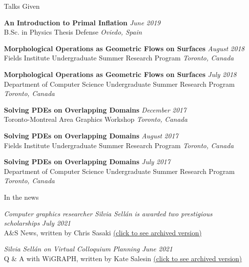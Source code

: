 \documentclass{resume}
\newcommand{\talk}[4]{
    {\bf #1} \hfill {\em \small #2} \\ %
    {\small #3} \hfill {\em \small #4}
}
\begin{document}
\begin{rSection}{Talks Given}
\talk{An Introduction to Primal Inflation}{June 2019}
{B.Sc. in Physics Thesis Defense}{Oviedo, Spain}

\talk{Morphological Operations as Geometric Flows on Surfaces}{August 2018}
{Fields Institute Undergraduate Summer Research Program}{Toronto, Canada}

\talk{Morphological Operations as Geometric Flows on Surfaces}{July 2018}
{Department of Computer Science Undergraduate Summer Research Program}{Toronto, Canada}

\talk{Solving PDEs on Overlapping Domains}{December 2017}
{Toronto-Montreal Area Graphics Workshop}{Toronto, Canada}

\talk{Solving PDEs on Overlapping Domains}{August 2017}
{Fields Institute Undergraduate Summer Research Program}{Toronto, Canada}

\talk{Solving PDEs on Overlapping Domains}{July 2017}
{Department of Computer Science Undergraduate Summer Research Program}{Toronto, Canada}

\end{rSection}

\begin{rSection}{In the news}


{\it Computer graphics researcher Silvia Sellán is awarded two prestigious scholarships} \hfill {\small \it July 2021}\\ 
{\small A\&S News, written by Chris Sasaki \href{https://web.cs.toronto.edu/news-events/news/silvia-sellan-scholarships}{(click to see archived version)}} 

{\it Silvia Sellán on Virtual Colloquium Planning} \hfill {\small \it June 2021}\\ 
{\small Q \& A with WiGRAPH, written by Kate Salesin \href{https://www.wigraph.org/spotlights/silvia-sellan-on-virtual-colloquium-planning/}{(click to see archived version)}} 

\end{rSection}
\end{document}
